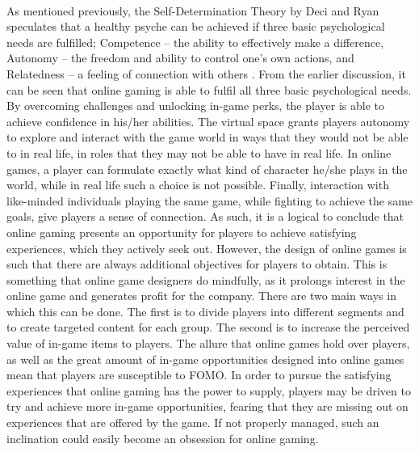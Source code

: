     \paragraph{}
      As mentioned previously, the Self-Determination Theory by Deci and Ryan speculates that a healthy psyche can be achieved if three basic psychological needs are fulfilled; Competence – the ability to effectively make a difference, Autonomy – the freedom and ability to control one’s own actions, and Relatedness – a feeling of connection with others \cite{przybylski2013motivational}. From the earlier discussion, it can be seen that online gaming is able to fulfil all three basic psychological needs. By overcoming challenges and unlocking in-game perks, the player is able to achieve confidence in his/her abilities. The virtual space grants players autonomy to explore and interact with the game world in ways that they would not be able to in real life, in roles that they may not be able to have in real life. In online games, a player can formulate exactly what kind of character he/she plays in the world, while in real life such a choice is not possible. Finally, interaction with like-minded individuals playing the same game, while fighting to achieve the same goals, give players a sense of connection. As such, it is a logical to conclude that online gaming presents an opportunity for players to achieve satisfying experiences, which they actively seek out. However, the design of online games is such that there are always additional objectives for players to obtain. This is something that online game designers do mindfully, as it prolongs interest in the online game and generates profit for the company. There are two main ways in which this can be done. The first is to divide players into different segments and to create targeted content for each group. The second is to increase the perceived value of in-game items to players. \cite{hamari2010game} The allure that online games hold over players, as well as the great amount of in-game opportunities designed into online games mean that players are susceptible to FOMO. In order to pursue the satisfying experiences that online gaming has the power to supply, players may be driven to try and achieve more in-game opportunities, fearing that they are missing out on experiences that are offered by the game. If not properly managed, such an inclination could easily become an obsession for online gaming.  
